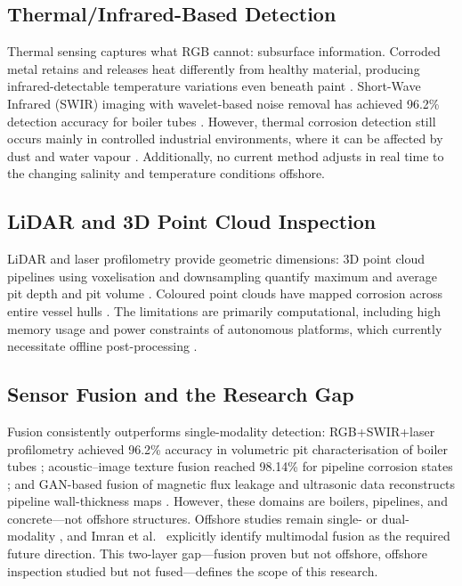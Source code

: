 \documentclass[conference]{IEEEtran}
\begin{document}
\subsection{Thermal/Infrared-Based Detection}
Thermal sensing captures what RGB cannot: subsurface information. Corroded metal retains and releases heat differently from healthy material, producing infrared-detectable temperature variations even beneath paint \cite{zhang2026application}. Short-Wave Infrared (SWIR) imaging with wavelet-based noise removal has achieved 96.2\% detection accuracy for boiler tubes \cite{zhang2026application}. However, thermal corrosion detection still occurs mainly in controlled industrial environments, where it can be affected by dust and water vapour \cite{zhang2026application}. Additionally, no current method adjusts in real time to the changing salinity and temperature conditions offshore.

\subsection{LiDAR and 3D Point Cloud Inspection}
LiDAR and laser profilometry provide geometric dimensions: 3D point cloud pipelines using voxelisation and downsampling quantify maximum and average pit depth and pit volume \cite{zhang2026application, olawole2026advanced}. Coloured point clouds have mapped corrosion across entire vessel hulls \cite{yu2022surface}. The limitations are primarily computational, including high memory usage and power constraints of autonomous platforms, which currently necessitate offline post-processing \cite{olawole2026advanced}.

\subsection{Sensor Fusion and the Research Gap}
Fusion consistently outperforms single-modality detection: RGB+SWIR+laser profilometry achieved 96.2\% accuracy in volumetric pit characterisation of boiler tubes \cite{zhang2026application}; acoustic--image texture fusion reached 98.14\% for pipeline corrosion states \cite{yang2026pipeline}; and GAN-based fusion of magnetic flux leakage and ultrasonic data reconstructs pipeline wall-thickness maps \cite{olawole2026advanced}. However, these domains are boilers, pipelines, and concrete—not offshore structures. Offshore studies remain single- or dual-modality \cite{soares2023autonomous, imran2025ship, yu2022surface}, and Imran et al.\ \cite{imran2025ship} explicitly identify multimodal fusion as the required future direction. This two-layer gap—fusion proven but not offshore, offshore inspection studied but not fused—defines the scope of this research.
\end{document}
